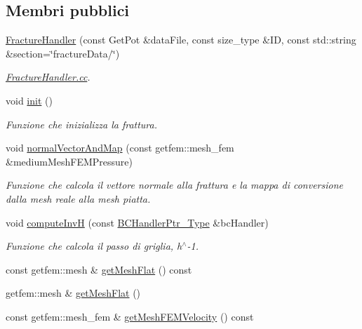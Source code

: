 \subsection*{Membri pubblici}
\begin{DoxyCompactItemize}
\item 
\hyperlink{classFractureHandler_aa3872456d95550cdd424908bbb5a15ec}{Fracture\-Handler} (const Get\-Pot \&data\-File, const size\-\_\-type \&I\-D, const std\-::string \&section=\char`\"{}fracture\-Data/\char`\"{})
\begin{DoxyCompactList}\small\item\em \hyperlink{FractureHandler_8cc}{Fracture\-Handler.\-cc}. \end{DoxyCompactList}\item 
void \hyperlink{classFractureHandler_aa28ce054ba2a2679214956c71f8cf1e0}{init} ()
\begin{DoxyCompactList}\small\item\em Funzione che inizializza la frattura. \end{DoxyCompactList}\item 
void \hyperlink{classFractureHandler_aec1fc4e2664b3fe60877b63024af3605}{normal\-Vector\-And\-Map} (const getfem\-::mesh\-\_\-fem \&medium\-Mesh\-F\-E\-M\-Pressure)
\begin{DoxyCompactList}\small\item\em Funzione che calcola il vettore normale alla frattura e la mappa di conversione dalla mesh reale alla mesh piatta. \end{DoxyCompactList}\item 
void \hyperlink{classFractureHandler_a87f0f8e2998b621b481173ec8d9aaa2a}{compute\-Inv\-H} (const \hyperlink{BCHandler_8h_aa175884cb453788647f17f2230a2a762}{B\-C\-Handler\-Ptr\-\_\-\-Type} \&bc\-Handler)
\begin{DoxyCompactList}\small\item\em Funzione che calcola il passo di griglia, h$^\wedge$-\/1. \end{DoxyCompactList}\item 
const getfem\-::mesh \& \hyperlink{classFractureHandler_a9ff9f584b850d6b750981befdbefbdbe}{get\-Mesh\-Flat} () const 
\item 
getfem\-::mesh \& \hyperlink{classFractureHandler_ad9b02a825d444016b3ab8ee901f887f6}{get\-Mesh\-Flat} ()
\item 
const getfem\-::mesh\-\_\-fem \& \hyperlink{classFractureHandler_ae54c07023428b44556bbec4da5be9306}{get\-Mesh\-F\-E\-M\-Velocity} () const 
\item 

\end{DoxyCompactItemize}
